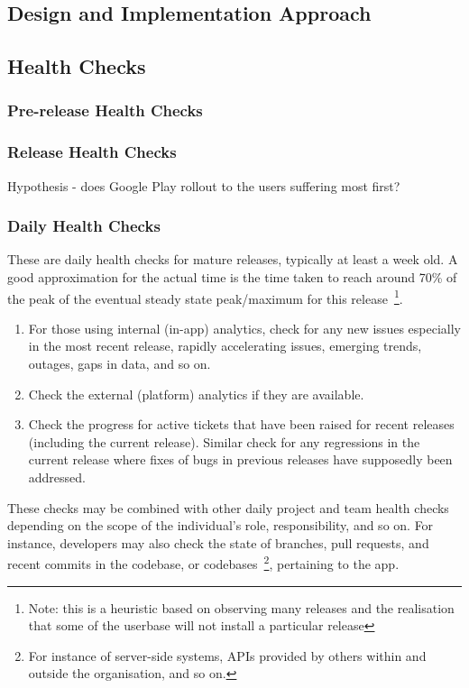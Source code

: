 \subsection{Design and Implementation Approach}

\subsection{Health Checks}

\subsubsection{Pre-release Health Checks}


\subsubsection{Release Health Checks}

Hypothesis - does Google Play rollout to the users suffering most first?

\subsubsection{Daily Health Checks}
These are daily health checks for mature releases, typically at least a week old. A good approximation for the actual time is the time taken to reach around 70\% of the peak of the eventual steady state peak/maximum for this release~\footnote{Note: this is a heuristic based on observing many releases and the realisation that some of the userbase will not install a particular release}.


\begin{enumerate}
    \item For those using internal (in-app) analytics, check for any new issues especially in the most recent release, rapidly accelerating issues, emerging trends, outages, gaps in data, and so on.
    \item Check the external (platform) analytics if they are available.
    \item Check the progress for active tickets that have been raised for recent releases (including the current release). Similar check for any regressions in the current release where fixes of bugs in previous releases have supposedly been addressed.
\end{enumerate}

These checks may be combined with other daily project and team health checks depending on the scope of the individual's role, responsibility, and so on. For instance, developers may also check the state of branches, pull requests, and recent commits in the codebase, or codebases~\footnote{For instance of server-side systems, APIs provided by others within and outside the organisation, and so on.}, pertaining to the app.
